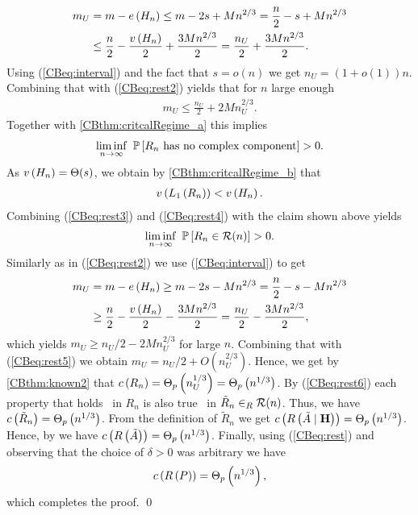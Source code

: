 \begin{align}\label{CBeq:rest2}
m_U&= m-e\left({H_n}\right)\leq m-2s+Mn^{2/3}=\frac{n}{2}-s+Mn^{2/3}\nonumber
\\
&\leq \frac{n}{2}-\frac{v\left({H_n}\right)}{2}+\frac{3Mn^{2/3}}{2}=\frac{n_U}{2}+\frac{3Mn^{2/3}}{2}.
\end{align}
Using (\ref{CBeq:interval}) and the fact that $s=o(n)$ we get $n_U=(1+o(1))n$. Combining that with (\ref{CBeq:rest2}) yields that for $n$ large enough
\begin{align}\label{CBeq:rest5}
m_U\leq \frac{n_U}{2}+2Mn_U^{2/3}.
\end{align}
Together with \ref{CBthm:critcalRegime_a} this implies
\begin{align}\label{CBeq:rest3}
\liminf_{n \to \infty}~ \mathbb{P}\left[R_n \text{ has no complex component}\right]>0.
\end{align}
As $v\left({H_n}\right)=\Theta(s)$, we obtain by \ref{CBthm:critcalRegime_b} that \whp
\begin{align}\label{CBeq:rest4}
	v\left({L_1\left(R_n\right)}\right)<v\left({H_n}\right).
\end{align}
Combining (\ref{CBeq:rest3}) and (\ref{CBeq:rest4}) with the claim shown above yields
\begin{align}\label{CBeq:rest6}
\liminf_{n \to \infty} ~ \mathbb{P}\left[R_n\in \mathcal{R}(n)\right]>0.
\end{align}
Similarly as in (\ref{CBeq:rest2}) we use (\ref{CBeq:interval}) to get
\begin{align*}
m_U&= m-e\left({H_n}\right)\geq m-2s-Mn^{2/3}=\frac{n}{2}-s-Mn^{2/3}
\\
&\geq \frac{n}{2}-\frac{v\left({H_n}\right)}{2}-\frac{3Mn^{2/3}}{2}=\frac{n_U}{2}-\frac{3Mn^{2/3}}{2},
\end{align*}
which yields $m_U\geq n_U/2-2Mn_U^{2/3}$ for large $n$. Combining that with (\ref{CBeq:rest5}) we obtain $m_U=n_U/2+O\left(n_U^{2/3}\right)$. Hence, we get by \ref{CBthm:known2} that $c\left({R_n}\right)=\Theta_p\left(n_U^{1/3}\right)=\Theta_p\left(n^{1/3}\right)$. By (\ref{CBeq:rest6}) each property that holds \whp\ in $R_n$ is also true \whp\ in $\tilde{R}_n \in_R \mathcal{R}(n)$. Thus, we have $c\left({\tilde{R}_n}\right)=\Theta_p\left(n^{1/3}\right)$. From the definition of $\tilde{R}_n$ we get $c\left({R\left(\tilde{A} \mid \mathbf{H}\right)}\right)=\Theta_p\left(n^{1/3}\right)$. Hence, by  we have $c\left({R\left(\tilde{A}\right)}\right)=\Theta_p\left(n^{1/3}\right)$. Finally, using (\ref{CBeq:rest}) and observing that the choice of $\delta>0$ was arbitrary we have 
\[c\left({R\left(P\right)}\right)=\Theta_p\left(n^{1/3}\right),\]
which completes the proof.
\qed

